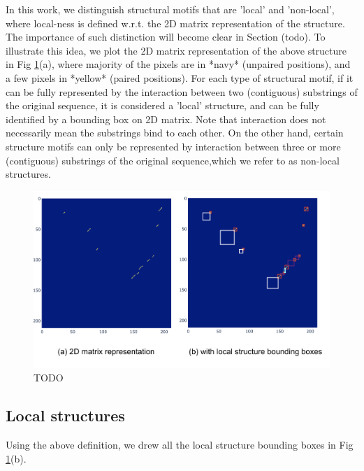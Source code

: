 \documentclass[12pt]{article}
\begin{document}
In this work, we distinguish structural motifs that are 'local' and 'non-local',
where local-ness is defined w.r.t. the 2D matrix representation of the structure.
The importance of such distinction will become clear in Section (todo).
To illustrate this idea, we plot the 2D matrix representation of the above structure
in Fig \ref{fig:structural_motif_2d_matrix}(a),
where majority of the pixels are in *navy* (unpaired positions),
and a few pixels in *yellow* (paired positions).
For each type of structural motif, if it can be fully represented by the interaction between
two (contiguous) substrings of the original sequence, it is considered a 'local' structure,
and can be fully identified by a bounding box on 2D matrix.
Note that interaction does not necessarily mean the substrings bind to each other.
On the other hand, certain structure motifs can only be represented by interaction between
three or more (contiguous) substrings of the original sequence,which we refer to as non-local structures.

\begin{figure}[h]
    \centering
    \includegraphics[width=\textwidth]{plot/structural_motif_2d_matrix.png}
    \caption{TODO}
    \label{fig:structural_motif_2d_matrix}
    \centering
\end{figure}


\subsection{Local structures}


Using the above definition, we drew all the local structure bounding boxes
in Fig \ref{fig:structural_motif_2d_matrix}(b).
\end{document}
